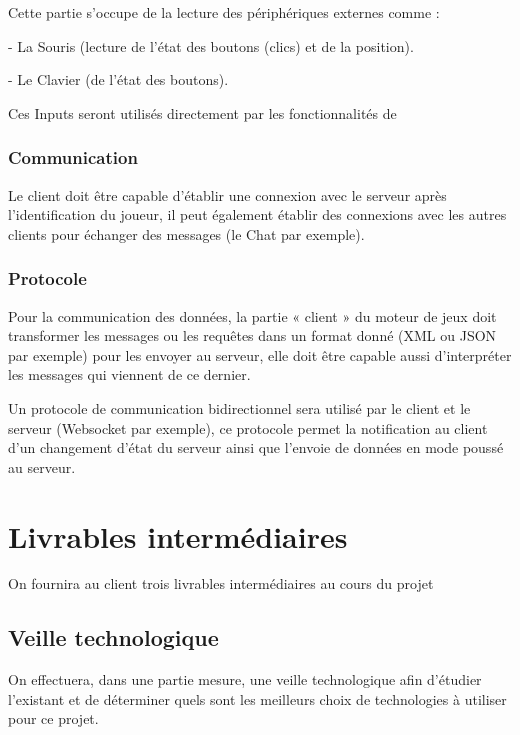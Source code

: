 \documentclass[a4paper,10pt]{report}
\begin{document}
        Cette partie s'occupe de la lecture des périphériques externes comme :

        - La Souris (lecture de l'état des boutons (clics) et de la position).

        - Le Clavier (de l'état des boutons).

        Ces Inputs seront utilisés directement par les fonctionnalités de

      \subsection{Communication}

        Le client doit être capable d’établir une connexion avec le serveur après l’identification du joueur, il peut également établir des connexions avec les autres clients pour échanger des messages (le Chat par exemple).

      \subsection{Protocole}

        Pour la communication des données, la partie « client » du moteur de jeux doit transformer les messages ou les requêtes dans un format donné (XML ou JSON par exemple) pour les envoyer au serveur, elle doit être capable aussi d’interpréter les messages qui viennent de ce dernier.

        Un protocole de communication bidirectionnel sera utilisé par le client et le serveur (Websocket par exemple), ce protocole permet la notification au client d’un changement d’état du serveur ainsi que l’envoie de données en mode poussé au serveur.



  \chapter{Livrables intermédiaires}

    On fournira au client trois livrables intermédiaires au cours du projet
    
    \section{Veille technologique}
    
      On effectuera, dans une partie mesure, une veille technologique afin d'étudier l'existant et de déterminer quels sont les meilleurs choix de technologies à utiliser pour ce projet. 
      
\end{document}
